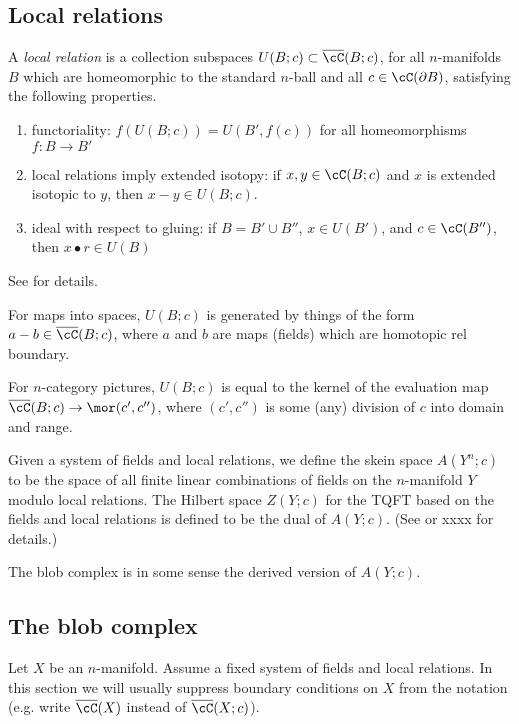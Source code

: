 \documentclass[11pt,leqno]{amsart}
\begin{document}
\subsection{Local relations}
\label{sec:local-relations}


A {\it local relation} is a collection subspaces $U(B; c) \sub \lf(B; c)$,
for all $n$-manifolds $B$ which are
homeomorphic to the standard $n$-ball and all $c \in \cC(\bd B)$, 
satisfying the following properties.
\begin{enumerate}
\item functoriality: 
$f(U(B; c)) = U(B', f(c))$ for all homeomorphisms $f: B \to B'$
\item local relations imply extended isotopy: 
if $x, y \in \cC(B; c)$ and $x$ is extended isotopic 
to $y$, then $x-y \in U(B; c)$.
\item ideal with respect to gluing:
if $B = B' \cup B''$, $x\in U(B')$, and $c\in \cC(B'')$, then $x\bullet r \in U(B)$
\end{enumerate}
See \cite{kw:tqft} for details.


For maps into spaces, $U(B; c)$ is generated by things of the form $a-b \in \lf(B; c)$,
where $a$ and $b$ are maps (fields) which are homotopic rel boundary.

For $n$-category pictures, $U(B; c)$ is equal to the kernel of the evaluation map
$\lf(B; c) \to \mor(c', c'')$, where $(c', c'')$ is some (any) division of $c$ into
domain and range.


Given a system of fields and local relations, we define the skein space
$A(Y^n; c)$ to be the space of all finite linear combinations of fields on
the $n$-manifold $Y$ modulo local relations.
The Hilbert space $Z(Y; c)$ for the TQFT based on the fields and local relations
is defined to be the dual of $A(Y; c)$.
(See \cite{kw:tqft} or xxxx for details.)


The blob complex is in some sense the derived version of $A(Y; c)$.



\subsection{The blob complex}
\label{sec:blob-definition}

Let $X$ be an $n$-manifold.
Assume a fixed system of fields and local relations.
In this section we will usually suppress boundary conditions on $X$ from the notation
(e.g. write $\lf(X)$ instead of $\lf(X; c)$).
\end{document}
